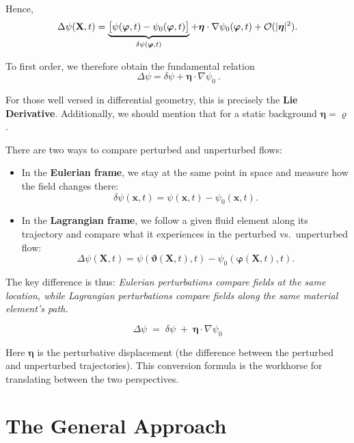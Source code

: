 Hence,
\[
\Delta \psi({\bf X},t) 
= \underbrace{\big[\psi(\boldsymbol{\varphi},t)-\psi_0(\boldsymbol{\varphi},t)\big]}_{\delta\psi(\boldsymbol{\varphi},t)}
+ \boldsymbol{\eta}\cdot\nabla \psi_0(\boldsymbol{\varphi},t)
+ \mathcal{O}(|\boldsymbol{\eta}|^2).
\]

To first order, we therefore obtain the fundamental relation
\begin{equation}
    \label{eq:convert_perturbs}
    \boxed{ \ \Delta \psi = \delta \psi + \boldsymbol{\eta}\cdot\nabla\psi_0 \ }.
\end{equation}
\begin{remark}
    For those well versed in differential geometry, this is precisely the \textbf{Lie Derivative}. Additionally, we should mention that for a static background $\boldsymbol{\eta} = \boldsymbol{\varrho}$.
\end{remark}

\begin{bigidea}
There are two ways to compare perturbed and unperturbed flows:

\begin{itemize}
    \item In the \textbf{Eulerian frame}, we stay at the same point in space 
    and measure how the field changes there:
    \[
    \delta \psi(\mathbf{x},t) = \psi(\mathbf{x},t) - \psi_0(\mathbf{x},t).
    \]

    \item In the \textbf{Lagrangian frame}, we follow a given fluid element along its trajectory 
    and compare what it experiences in the perturbed vs.\ unperturbed flow:
    \[
    \Delta \psi(\mathbf{X},t) = \psi(\boldsymbol{\vartheta}(\mathbf{X},t),t) 
    - \psi_0(\boldsymbol{\varphi}(\mathbf{X},t),t).
    \]
\end{itemize}

The key difference is thus:  
\emph{Eulerian perturbations compare fields at the same location,  while Lagrangian perturbations compare fields along the same material element’s path.}

\[
\boxed{\;\Delta \psi \;=\; \delta \psi \;+\; \boldsymbol{\eta}\cdot\nabla \psi_0 \;}
\]

Here $\boldsymbol{\eta}$ is the perturbative displacement (the difference between the perturbed and unperturbed trajectories).  
This conversion formula is the workhorse for translating between the two perspectives.
\end{bigidea}

\section{The General Approach}


